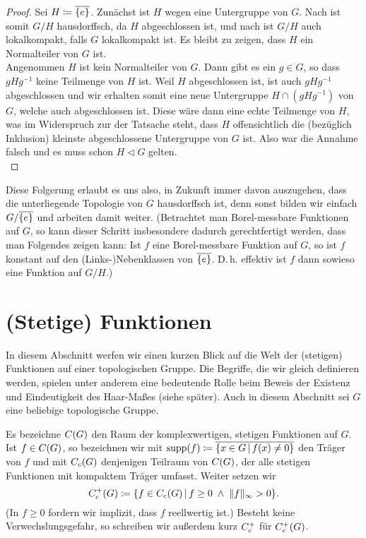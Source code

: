 \begin{proof}
    Sei $H\coloneqq \overline{\{e\}}$. 
    Zunächst ist $H$ wegen  eine Untergruppe von $G$.
    Nach  ist somit $G/H$ hausdorffsch, da $H$
    abgeschlossen ist, und nach  ist $G/H$ auch
    lokalkompakt, falls $G$ lokalkompakt ist. Es bleibt zu zeigen, dass $H$ ein
    Normalteiler von $G$ ist.
    \\
    Angenommen $H$ ist kein Normalteiler von $G$. Dann gibt es ein $g\in G$,
    so dass $gHg^{-1}$ keine Teilmenge von $H$ ist. Weil $H$ abgeschlossen ist,
    ist auch $gHg^{-1}$ abgeschlossen und wir erhalten somit eine neue
    Untergruppe $H \cap (gHg^{-1})$ von $G$, welche auch abgeschlossen ist.
    Diese wäre dann eine echte Teilmenge von $H$, was im Widerspruch zur
    der Tatsache steht, dass $H$ offensichtlich die (bezüglich Inklusion)
    kleinste abgeschlossene Untergruppe von $G$ ist. Also war die Annahme falsch
    und es muss schon $H\triangleleft G$ gelten.
    \\
\end{proof}

Diese Folgerung erlaubt es uns also, in Zukunft immer davon auszugehen, dass die
unterliegende Topologie von $G$ hausdorffsch ist, denn sonst bilden wir einfach
$G/\overline{\{e\}}$ und arbeiten damit weiter. (Betrachtet man Borel-messbare
Funktionen auf $G$, so kann dieser Schritt insbesondere dadurch gerechtfertigt
werden, dass man Folgendes zeigen kann: Ist $f$ eine Borel-messbare Funktion auf
$G$, so ist $f$ konstant auf den (Links-)Nebenklassen von $\overline{\{e\}}$.
D.\,h. effektiv ist $f$ dann sowieso eine Funktion auf $G/H$.)


\section{(Stetige) Funktionen}
In diesem Abschnitt werfen wir einen kurzen Blick auf die Welt der (stetigen)
Funktionen auf einer topologischen Gruppe. Die Begriffe, die wir gleich
definieren werden, spielen unter anderem eine bedeutende Rolle beim Beweis der
Existenz und Eindeutigkeit des Haar-Maßes (siehe später). %
Auch in diesem Abschnitt sei $G$ eine beliebige topologische Gruppe.

\begin{thNotation}
    Es bezeichne $C(G)$ den Raum der komplexwertigen, stetigen
    Funktionen auf $G$. Ist $f\in C(G)$, so bezeichnen wir mit 
    $\supp(f) \defeq \setclosure{ \{ x\in G \Mid f(x) \neq 0 \} }$
    den Träger von $f$ und mit $C_c(G)$ denjenigen Teilraum von
    $C(G)$, der alle stetigen Funktionen mit kompaktem Träger umfasst.
    Weiter setzen wir
    \[ \contcompplus(G) \defeq \{ f\in \contcomp(G) \Mid 
        f \geq 0 \;\wedge\; \supnorm{f} > 0 \}
    . \]
    (In $f\geq 0$ fordern wir implizit, dass $f$ reellwertig ist.)
    Besteht keine Verwechslungsgefahr, so schreiben wir außerdem kurz
    $C_c^+$ für $C_c^+(G)$.
\end{thNotation}

